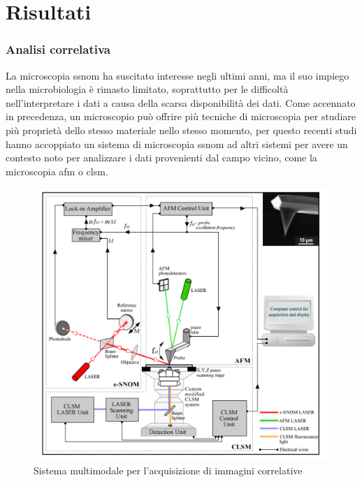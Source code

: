 \documentclass[../main.tex]{subfiles}
\begin{document}
\chapter{Risultati}





\subsection{Analisi correlativa}
La microscopia \acrshort{ssnom} ha suscitato interesse negli ultimi anni, ma il suo impiego nella \gls{microbiologia} è rimasto limitato, soprattutto per le difficoltà nell'interpretare i dati a causa della scarsa disponibilità dei dati. Come accennato in precedenza, un microscopio può offrire più tecniche di microscopia per studiare più proprietà dello stesso materiale nello stesso momento, per questo recenti studi hanno accoppiato un sistema di microscopia \acrshort{ssnom} ad altri sistemi per avere un contesto noto per analizzare i dati provenienti dal campo vicino, come la microscopia \acrfull{afm} o \acrshort{clsm}.\cite{stanciu_2017}

\begin{figure}[h]
\centering
\includegraphics[keepaspectratio, height=\linewidth]{images/multimodal_system.jpg}
\caption[Sistema multimodale per l'acquisizione di immagini correlative]{
	Sistema multimodale per l'acquisizione di immagini correlative \cite{stanciu_2017}}
\label{fig:multimodal_system}
\end{figure}
\end{document}
